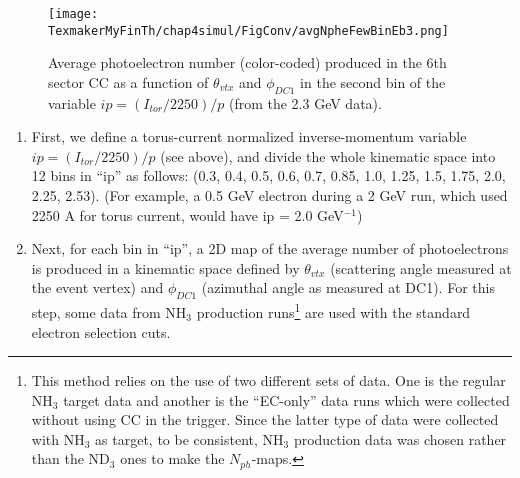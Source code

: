 \begin{figure}[H] %
\centering
  \leavevmode \texttt{[image: TexmakerMyFinTh/chap4simul/FigConv/avgNpheFewBinEb3.png]} 
  \caption[2D map of Nphe in a p-bin]{Average photoelectron number (color-coded) produced in the 6th sector CC as a function of $\theta_{vtx}$ and $\phi_{DC1}$ in the second bin of the variable $ip = (I_{tor}/2250)/p$ (from the 2.3 GeV  data).}
  \label{avgNpheEb3}
\end{figure}




\begin{enumerate}
\item First, we define a torus-current normalized inverse-momentum variable $ip = (I_{tor}/2250)/p$ (see above), and divide the whole 
kinematic space into 12 bins in ``ip'' as follows: (0.3, 0.4, 0.5, 0.6, 0.7, 0.85, 1.0, 1.25, 1.5, 1.75, 2.0, 2.25, 2.53). (For example, a 0.5 GeV electron during a 2 GeV run, which used 2250 A for torus current, would have ip = 2.0 GeV$^{-1}$) %
\item Next, for each bin in ``ip'', a 2D map of the average number of photoelectrons %
is produced in a kinematic space defined by $\theta_{vtx}$ (scattering angle measured at the event vertex) and $\phi_{DC1}$ (azimuthal angle as measured at DC1). For this step, some data from NH$_3$ production runs\footnote{This method relies on the use of two different sets of data. One is the regular NH$_3$ target data and another is the ``EC-only'' %
 data runs which were collected without using CC in the trigger. Since the latter type of data were collected with NH$_3$ as target, to be consistent, NH$_3$ production data was chosen rather than the ND$_3$ ones to make the $N_{ph}$-maps.} are used with the standard electron selection cuts. %

\end{enumerate}
